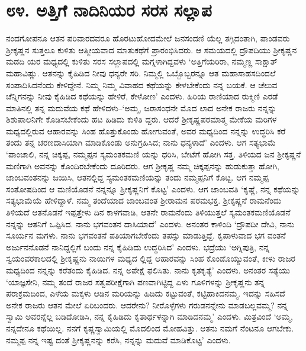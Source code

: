
\chapter{೮೪. ಅತ್ತಿಗೆ ನಾದಿನಿಯರ ಸರಸ ಸಲ್ಲಾಪ}

ನಂದಗೋಪನೂ ಆತನ ಪರಿವಾರದವರೂ ಹೊರಟುಹೋದಮೇಲೆ ಜನಸಂದಣಿ ಯೆಲ್ಲ ತಗ್ಗಿದಂತಾಗಿ, ಪಾಂಡವರು ಶ್ರೀಕೃಷ್ಣನ ಸುತ್ತಲೂ ಕುಳಿತು ಆತ್ಮೀಯವಾದ ಮಾತುಕಥೆಗೆ ಪ್ರಾರಂಭಿಸಿದರು. ಆ ಸಮಯದಲ್ಲಿ ದ್ರೌಪದಿಯು ಶ್ರೀಕೃಷ್ಣನ ಮಡದಿ ಯರ ಮಧ್ಯದಲ್ಲಿ ಕುಳಿತು ಸರಸ ಸಲ್ಲಾಪದಲ್ಲಿ ಮಗ್ನಳಾಗಿದ್ದವಳು ‘ಅತ್ತಿಗೆಯರಿರಾ, ನಮ್ಮಣ್ಣ ಸಾಕ್ಷಾತ್ ಮಹಾವಿಷ್ಣು. ಆತನನ್ನು ಕೈಹಿಡಿದ ನೀವು ಧನ್ಯರೇ ಸರಿ. ನಿಮ್ಮಲ್ಲಿ ಒಬ್ಬೊಬ್ಬರನ್ನೂ ಆತ ಮಹಾಸಾಹಸದಿಂದಲೆ ಸಂಪಾದಿಸಿದನೆಂದು ಕೇಳಿದ್ದೇನೆ. ನಿಮ್ಮ ನಿಮ್ಮ ವಿವಾಹದ ಕಥೆಯನ್ನು ಕೇಳಬೇಕೆಂದು ನನ್ನ ಬಯಕೆ. ಆ ಚೆಲುವ ಚೆನ್ನಿಗನನ್ನು ನೀವು ಕೈಹಿಡಿದ ಕಥೆಯನ್ನು ಹೇಳಿರೆ, ಕೇಳೋಣ’ ಎಂದಳು. ಹಿರಿಯ ರಾಣಿಯಾದ ರುಕ್ಮಿಣಿ ಎರಡೆ ಮಾತಿನಲ್ಲಿ ತನ್ನ ಮದುವೆಯ ಕಥೆ ಹೇಳಿದಳು–‘ಅಮ್ಮ, ಜರಾಸಂಧನೇ ಮೊದ ಲಾದ ಅನೇಕ ರಾಜರು ನನ್ನನ್ನು ಶಿಶುಪಾಲನಿಗೇ ಕೊಡಿಸಬೇಕೆಂದು ಹಟ ಹಿಡಿದು ಕುಳಿತಿ ದ್ದರು. ಆದರೆ ಶ್ರೀಕೃಷ್ಣಪರಮಾತ್ಮ ಮೇಕೆಯ ಮರಿಗಳ ಮಧ್ಯದಲ್ಲಿರುವ ಆಹಾರವನ್ನು ಸಿಂಹ ಹೊತ್ತುಕೊಂಡು ಹೋಗುವಂತೆ, ಅವರ ಮಧ್ಯದಿಂದ ನನ್ನನ್ನು ಉದ್ಧರಿಸಿ ಕರೆ ತಂದು ತನ್ನ ಚರಣದಾಸಿಯಾಗಿ ಮಾಡಿಕೊಂಡು ಅನುಗ್ರಹಿಸಿದ; ನಾನು ಧನ್ಯಳಾದೆ’ ಎಂದಳು. ಆಗ ಸತ್ಯಭಾಮೆ ‘ಪಾಂಚಾಲಿ, ನನ್ನ ಚಿಕ್ಕಪ್ಪ, ನಮ್ಮಪ್ಪನ ಸ್ಯಮಂತಕಮಣಿ ಯನ್ನು ಧರಿಸಿ, ಬೇಟೆಗೆ ಹೋಗಿ ಸತ್ತ. ತಿಳಿಯದ ಜನ ಶ್ರೀಕೃಷ್ಣನೆ ಮಣಿಗಾಗಿ ಅವನನ್ನು ಕೊಂದಿರಬೇಕೆಂದು ದೂರಿದರು. ಆಗ ಶ್ರೀಕೃಷ್ಣ ನಮ್ಮ ಚಿಕ್ಕಪ್ಪನನ್ನು ಹುಡುಕುತ್ತಾ ಹೋಗಿ, ಜಾಂಬವಂತನನ್ನು ಜಯಿಸಿ, ಆತನಲ್ಲಿದ್ದ ಸ್ಯಮಂತಕಮಣಿಯನ್ನು ತಂದು ನಮ್ಮಪ್ಪನಿಗೆ ಕೊಟ್ಟ. ಆಗ ನಮ್ಮಪ್ಪ ಸಂತೋಷದಿಂದ ಆ ಮಣಿಯೊಡನೆ ನನ್ನನ್ನೂ ಶ್ರೀಕೃಷ್ಣನಿಗೆ ಕೊಟ್ಟ’ ಎಂದಳು. ಆಗ ಜಾಂಬವತಿ ‘ಕೃಷ್ಣೆ, ನನ್ನ ಕಥೆಯನ್ನು ಸತ್ಯಭಾಮೆಯೆ ಹೇಳಿದ್ದಾಳೆ. ನಮ್ಮ ತಂದೆಯಾದ ಜಾಂಬವಂತ ಶ್ರೀರಾಮನ ಪರಮಭಕ್ತ. ಶ್ರೀಕೃಷ್ಣನೆ ರಾಮನೆಂದು ತಿಳಿಯದೆ ಆತನೊಡನೆ ಇಪ್ಪತ್ತೇಳು ದಿನ ಕಾಳಗವಾಡಿ, ಆತನೇ ರಾಮನೆಂದು ತಿಳಿಯುತ್ತಲೆ ಸ್ಯಮಂತಕಮಣಿಯೊಡನೆ ನನ್ನನ್ನು ಆತನಿಗೆ ಒಪ್ಪಿಸಿದ. ನಾನು ಭಗವಂತನ ದಾಸಿಯಾದೆ’ ಎಂದಳು. ಅನಂತರ ಕಾಳಿಂದಿ ‘ದ್ರೌಪದೀ ದೇವಿ, ನಾನು ಸೂರ್ಯನ ಮಗಳು. ನಾನು ಭಗವಂತನೆ ಪತಿಯಾಗಬೇಕೆಂದು ತಪಸ್ಸು ಮಾಡುತ್ತಿದ್ದೆ. ಕೃಪಾಳುವಾದ ಭಗ ವಂತನೆ ಅರ್ಜುನನೊಡನೆ ನಾನಿದ್ದಲ್ಲಿಗೆ ಬಂದು ನನ್ನ ಕೈಹಿಡಿದು ಉದ್ಧರಿಸಿದ’ ಎಂದಳು. ಭದ್ರೆಯು ‘ಅಗ್ನಿಪುತ್ರಿ, ನನ್ನ ಸ್ವಯಂವರಕಾಲದಲ್ಲಿ ಶ್ರೀಕೃಷ್ಣನು ನಾಯಿಗಳ ಮಧ್ಯದ ಲ್ಲಿದ್ದ ಆಹಾರವನ್ನು ಸಿಂಹ ಕೊಂಡೊಯ್ಯುವಂತೆ, ಕೀಳು ರಾಜರ ಮಧ್ಯದಿಂದ ನನ್ನನ್ನು ಕರೆತಂದು ಕೈಹಿಡಿದ. ನನ್ನ ಅಪೇಕ್ಷೆ ಫಲಿಸಿತು. ನಾನು ಕೃತಕೃತ್ಯೆ’ ಎಂದಳು. ಅನಂತರ ಸತ್ಯೆಯು ‘ಯಾಜ್ಞಸೇನಿ, ನಮ್ಮ ತಂದೆ ರಾಜರ ಸತ್ವಪರೀಕ್ಷೆಗಾಗಿ ಪಣವಾಗಿಟ್ಟಿದ್ದ ಏಳು ಗೂಳಿಗಳನ್ನು ಶ್ರೀಕೃಷ್ಣನು ತನ್ನ ಪರಾಕ್ರಮದಿಂದ, ಎಳೆಯ ಮಕ್ಕಳು ಆಡಿನ ಮರಿಯನ್ನು ಹಿಡಿದು ಕಟ್ಟುವಂತೆ, ಕಟ್ಟಿಹಾಕಿದನಮ್ಮ. ಇದನ್ನು ಸಹಿಸದೆ ಅನೇಕ ರಾಜರು ಆತನ ಮೇಲೆ ಏರಿಬಂದರು. ಆದರೇನು? ನೀರೊಳ್ಳೆಗಳು ಗರುಡನನ್ನೇನು ಮಾಡಬಲ್ಲವಮ್ಮ? ನನ್ನ ಸ್ವಾಮಿ ಅವರನ್ನೆಲ್ಲ ಬಡಿದೋಡಿಸಿ, ನನ್ನ ಕೈಹಿಡಿದು ಕೃತಾರ್ಥಳನ್ನಾಗಿ ಮಾಡಿದನಮ್ಮ’ ಎಂದಳು. ಮಿತ್ರವಿಂದೆ ‘ಅಮ್ಮ, ನನ್ನದೇನೂ ಕಥೆಯಿಲ್ಲ. ನನಗೆ ಕೃಷ್ಣಸ್ವಾಮಿಯಲ್ಲಿ ಮೊದಲಿಂದ ಮೋಹವಿತ್ತು. ಆತನು ನಮಗೆ ನೆಂಟನೂ ಆಗಬೇಕು. ನಮ್ಮಪ್ಪ ನನ್ನ ಇಷ್ಟ ದಂತೆ ಶ್ರೀಕೃಷ್ಣನನ್ನು ಕರೆಸಿ, ನನ್ನನ್ನು ಮದುವೆ ಮಾಡಿಕೊಟ್ಟ’ ಎಂದಳು.

